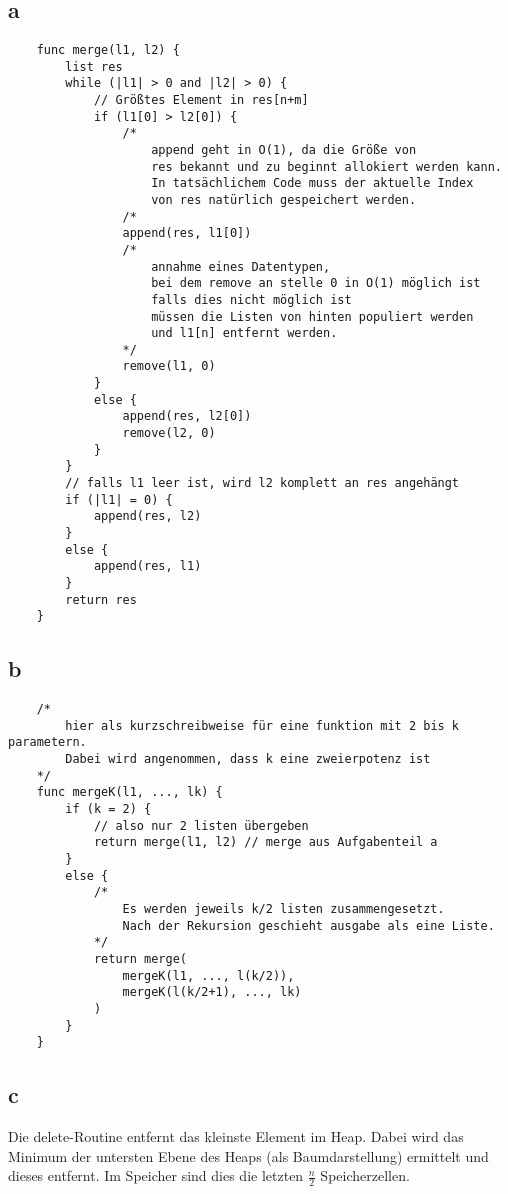 \documentclass{article}
\begin{document}
\section{}
\subsection*{a}
\begin{verbatim}
    func merge(l1, l2) {
        list res
        while (|l1| > 0 and |l2| > 0) {
            // Größtes Element in res[n+m]
            if (l1[0] > l2[0]) {
                /*
                    append geht in O(1), da die Größe von
                    res bekannt und zu beginnt allokiert werden kann.
                    In tatsächlichem Code muss der aktuelle Index
                    von res natürlich gespeichert werden.
                /*
                append(res, l1[0])
                /* 
                    annahme eines Datentypen, 
                    bei dem remove an stelle 0 in O(1) möglich ist
                    falls dies nicht möglich ist
                    müssen die Listen von hinten populiert werden
                    und l1[n] entfernt werden.
                */ 
                remove(l1, 0)
            }
            else {
                append(res, l2[0])
                remove(l2, 0)
            }
        }
        // falls l1 leer ist, wird l2 komplett an res angehängt
        if (|l1| = 0) {
            append(res, l2)
        }
        else {
            append(res, l1)
        }
        return res
    }
\end{verbatim}
\newpage
\subsection*{b}
\begin{verbatim}
    /* 
        hier als kurzschreibweise für eine funktion mit 2 bis k parametern.
        Dabei wird angenommen, dass k eine zweierpotenz ist
    */
    func mergeK(l1, ..., lk) {
        if (k = 2) {
            // also nur 2 listen übergeben
            return merge(l1, l2) // merge aus Aufgabenteil a
        }
        else {
            /*
                Es werden jeweils k/2 listen zusammengesetzt.
                Nach der Rekursion geschieht ausgabe als eine Liste.
            */
            return merge(
                mergeK(l1, ..., l(k/2)),
                mergeK(l(k/2+1), ..., lk)
            )
        }
    }
\end{verbatim}
\subsection*{c}
Die delete-Routine entfernt das kleinste Element im Heap.
Dabei wird das Minimum der untersten Ebene des Heaps 
(als Baumdarstellung) ermittelt und dieses entfernt.
Im Speicher sind dies die letzten $\frac{n}{2}$ Speicherzellen.
\end{document}
